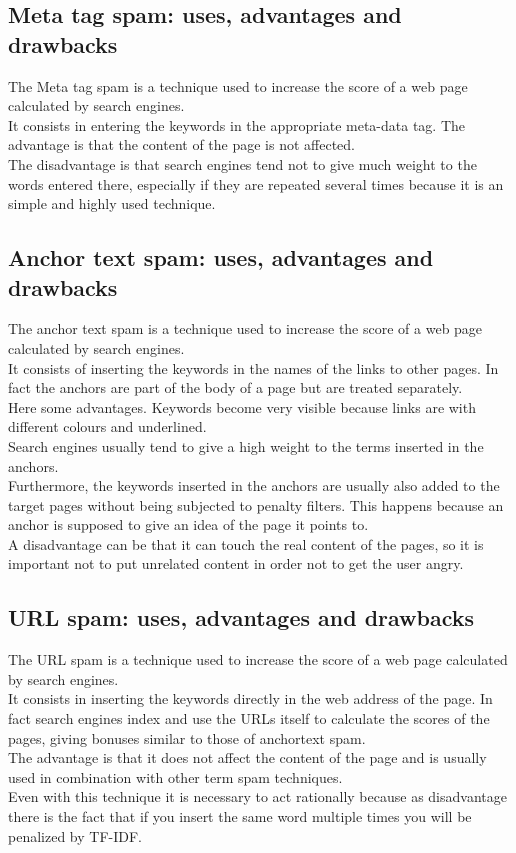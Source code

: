 \subsection{Meta tag spam: uses, advantages and drawbacks}
The Meta tag spam is a technique used to increase the score of a web page calculated
by search engines.\\
It consists in entering the keywords in the
appropriate meta-data tag. The advantage is that the content of
the page is not affected.\\
The disadvantage is that search engines tend not to give much weight
to the words entered there, especially if they are repeated several times
because it is an simple and highly used technique.

\subsection{Anchor text spam: uses, advantages and drawbacks}
The anchor text spam is a technique used to increase the score of a web page calculated
by search engines.\\
It consists of inserting the keywords in the names of the links to
other pages. In fact the anchors are part of the body of a page but are
treated separately.\\
Here some advantages. Keywords become very visible because links are
with different colours and underlined.\\
Search engines usually tend to give a high
weight to the terms inserted in the anchors.\\ Furthermore, the keywords
inserted in the anchors are usually also added to the target pages
without being subjected to penalty filters. This happens because an
anchor is supposed to give an idea of the page it points to.\\
A disadvantage can be that it can touch the real content of the pages, so
it is important not to put unrelated content in order not to get the user
angry.

\subsection{URL spam: uses, advantages and drawbacks}
The URL spam is a technique used to increase the score of a web page calculated
by search engines.\\
It consists in inserting the keywords directly in the web address
of the page. In fact search engines index and use the URLs itself
to calculate the scores of the pages, giving bonuses similar to those
of anchortext spam.\\
The advantage is that it does not affect the content of the page
and is usually used in combination with other term spam techniques.\\
Even with this technique it is necessary to act rationally because as disadvantage
there is the fact that
if you insert the same word multiple times you will be penalized by TF-IDF.

